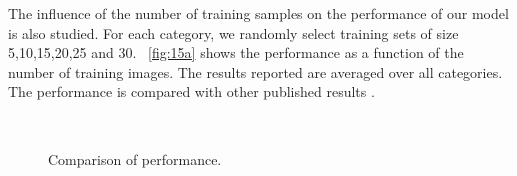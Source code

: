 \documentclass[twocolumn]{article}
\begin{document}
The influence of the number of training samples on the performance of our model is also studied.
For each category, we randomly select training sets of size 5,10,15,20,25 and 30.
\figurename~\ref{fig:15a} shows the performance as a function of the number of training images.
The results reported are averaged over all categories.
The performance is compared with other published results \cite{grauman2005,lazebnik2006,zhang2006,wang2006,bosch2007,boiman2008,liu2013,heo2014}.

\begin{figure}[!t]
\centering
  \\
\caption{Comparison of performance.}
\label{fig:15}
\end{figure}
\end{document}
